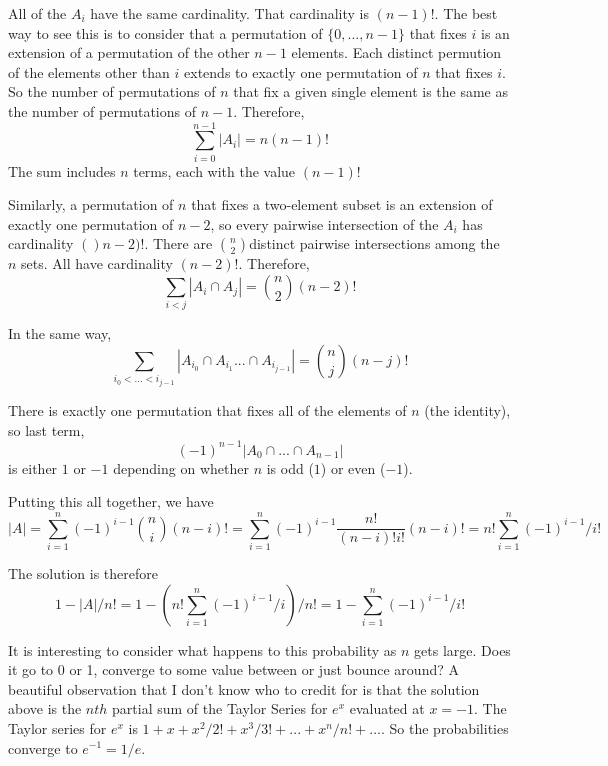 \documentclass[11pt,a4paper]{report}
\theoremstyle{plain}
\theoremstyle{definition}
\theoremstyle{remark}
\begin{document}
All of the $A_i$ have the same cardinality.  That cardinality is $(n-1)!$.  The best way to see this is to consider that a permutation of $\{0, ...,  n - 1\}$ that fixes $i$ is an extension of a permutation of the other $n - 1$ elements.  Each distinct permution of the elements other than $i$ extends to exactly one permutation of $n$ that fixes $i$.  So the number of permutations of $n$ that fix a given single element is the same as the number of permutations of $n - 1$.
Therefore,
$$\sum_{i=0}^{n-1} |A_{i}| = n(n-1)!$$
The sum includes $n$ terms, each with the value $(n - 1)!$

Similarly, a permutation of $n$ that fixes a two-element subset is an extension of exactly one permutation of $n-2$, so every pairwise intersection of the $A_i$ has cardinality $()n - 2)!$.  There are $\binom{n}{2} $distinct pairwise intersections among the $n$ sets.  All have cardinality $(n - 2)!$.  Therefore,
$$ \sum_{i < j} {|A_i \cap A_j|}  = \binom{n}{2} {(n - 2)}!$$

In the same way, 
$$\sum_{ i_0 < ...<i_{j-1}}{ |A_{i_0} \cap A_{i_1} ... \cap A_{i_{j-1}}|} = \binom{n}{j}(n - j)!$$

There is exactly one permutation that fixes all of the elements of $n$ (the identity), so last term, 
$$(-1)^{n-1}|A_{0} \cap ... \cap A_{n-1}|$$ 
is either $1$ or $-1$ depending on whether $n$ is odd ($1$) or  even ($-1$).

Putting this all together,  we have $$|A| = \sum_{i=1}^{n}(-1)^{i-1}\binom{n}{i}(n - i)! =  \sum_{i=1}^{n}(-1)^{i-1}\frac{n!}{(n - i)!i!}(n - i)!  = n!  \sum_{i=1}^{n}(-1)^{i-1}/i!$$ 

The solution is therefore $$1 - |A|/n! = 1 - (n!  \sum_{i=1}^{n}(-1)^{i-1}/i)/n! = 1 - \sum_{i=1}^{n}(-1)^{i-1}/i! $$

It is interesting to consider what happens to this probability as $n$ gets large.  Does it go to 0 or 1, converge to some value between or just bounce around?  A beautiful observation that I don't know who to credit for is that the solution above is the $nth$ partial sum of the Taylor Series for $e^x$ evaluated at $x=-1$.  The Taylor series for $e^x$ is $1 + x + x^2 / 2! + x^3 / 3! + ... + x^n/n! + ...$.  So the probabilities converge to $e^{-1} = 1/e.$
\end{document}
